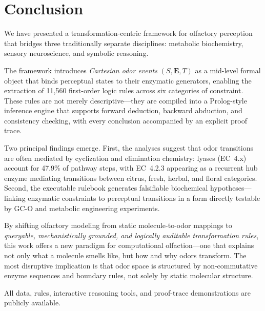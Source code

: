 \documentclass[a4paper,fleqn]{cas-sc}
\begin{document}
\section{Conclusion}\label{sec:conclusion}

We have presented a transformation-centric framework for olfactory perception that bridges three traditionally separate disciplines: metabolic biochemistry, sensory neuroscience, and symbolic reasoning.

The framework introduces \emph{Cartesian odor events} $(S, \mathbf{E}, T)$ as a mid-level formal object that binds perceptual states to their enzymatic generators, enabling the extraction of 11,560 first-order logic rules across six categories of constraint. These rules are not merely descriptive---they are compiled into a Prolog-style inference engine that supports forward deduction, backward abduction, and consistency checking, with every conclusion accompanied by an explicit proof trace.

Two principal findings emerge. First, the analyses suggest that odor transitions are often mediated by cyclization and elimination chemistry: lyases (EC~4.x) account for 47.9\% of pathway steps, with EC~4.2.3 appearing as a recurrent hub enzyme mediating transitions between citrus, fresh, herbal, and floral categories. Second, the executable rulebook generates falsifiable biochemical hypotheses---linking enzymatic constraints to perceptual transitions in a form directly testable by GC-O and metabolic engineering experiments.

By shifting olfactory modeling from static molecule-to-odor mappings to \emph{queryable, mechanistically grounded, and logically auditable transformation rules}, this work offers a new paradigm for computational olfaction---one that explains not only what a molecule smells like, but how and why odors transform. The most disruptive implication is that odor space is structured by non-commutative enzyme sequences and boundary rules, not solely by static molecular structure.

All data, rules, interactive reasoning tools, and proof-trace demonstrations are publicly available.

\printcredits



\end{document}
